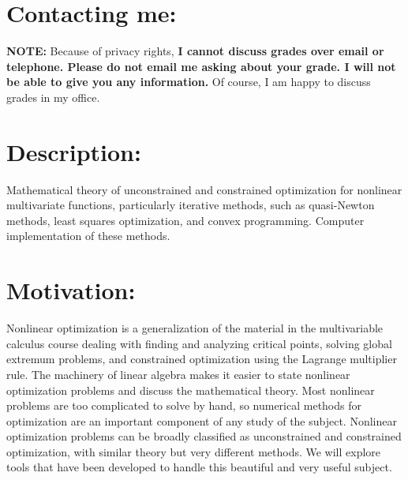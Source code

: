 \documentclass[margin]{res}
\theoremstyle{plain}
\theoremstyle{definition}
\theoremstyle{remark}
\begin{document}
\begin{resume}
\section{Contacting me:}

\textbf{NOTE:} Because of privacy rights, \textbf{I cannot discuss grades over email or telephone. Please do not email me asking about your grade.  I will not be able to give you any information.}  Of course, I am happy to discuss grades in my office.

\section{Description:} Mathematical theory of unconstrained and constrained optimization for nonlinear multivariate functions, particularly iterative methods, such as quasi-Newton methods, least squares optimization, and convex programming.  Computer implementation of these methods.


 \section{Motivation:} Nonlinear optimization is a generalization of the material in the multivariable calculus course dealing
with finding and analyzing critical points, solving global extremum problems, and constrained
optimization using the Lagrange multiplier rule. The machinery of linear algebra makes it easier to
state nonlinear optimization problems and discuss the mathematical theory. Most nonlinear problems
are too complicated to solve by hand, so numerical methods for optimization are an important
component of any study of the subject. Nonlinear optimization problems can be broadly classified as
unconstrained and constrained optimization, with similar theory but very different methods.  We will explore tools that have been developed to handle this beautiful and very useful subject.


\end{resume}
\end{document}
